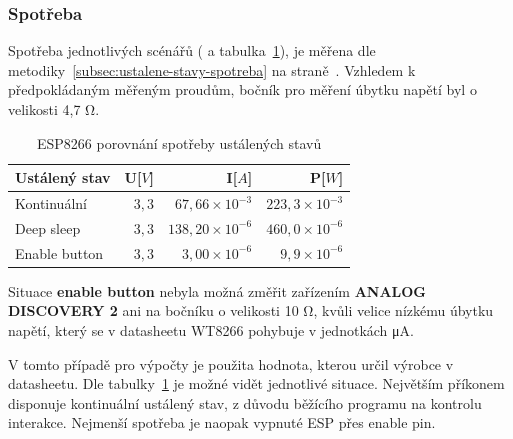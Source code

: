 \documentclass[a4paper, 12pt]{report}
\begin{document}
    \subsubsection{Spotřeba}
    Spotřeba jednotlivých scénářů ( a tabulka~\ref{tab:esp8266-klidove-rezimy-spotreba}), je měřena dle metodiky~\ref{subsec:ustalene-stavy-spotreba} na straně~\pageref{subsec:ustalene-stavy-spotreba}.
    Vzhledem k předpokládaným měřeným proudům, bočník pro měření úbytku napětí byl o velikosti 4,7 \si{\ohm}. \par
    \begin{table}[h!]
        \centering
        \caption{ESP8266 porovnání spotřeby ustálených stavů}
        \begin{tabular}{||l|r r r||}
            \hline
            Ustálený stav & U[$V$] & I[$A$]                  & P[$W$]                \\
            \hline
            Kontinuální   & $3,3$  & $67,66 \times 10^{-3}$  & $223,3 \times 10^{-3}$ \\
            Deep sleep    & $3,3$  & $138,20 \times 10^{-6}$ & $460,0 \times 10^{-6}$ \\
            Enable button & $3,3$  & $3,00\times 10^{-6}$    & $9,9\times 10^{-6}$    \\
            \hline
        \end{tabular}
        \label{tab:esp8266-klidove-rezimy-spotreba}
    \end{table}
    Situace \textbf{enable button} nebyla možná změřit zařízením \textbf{ANALOG DISCOVERY 2} ani na bočníku o velikosti 10 \si{\ohm}, kvůli velice nízkému úbytku napětí, který se v datasheetu WT8266 pohybuje v jednotkách \si{\micro A}.\par
    V tomto případě pro výpočty je použita hodnota, kterou určil výrobce v datasheetu.
    Dle tabulky~\ref{tab:esp8266-klidove-rezimy-spotreba} je možné vidět jednotlivé situace.
    Největším příkonem disponuje kontinuální ustálený stav, z důvodu běžícího programu na kontrolu interakce.
    Nejmenší spotřeba je naopak vypnuté ESP přes enable pin.
\end{document}
